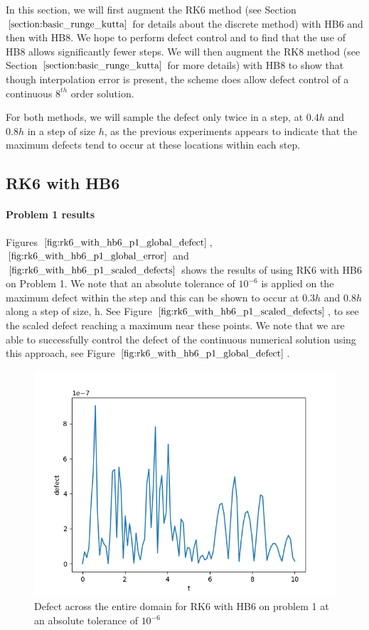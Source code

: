 In this section, we will first augment the RK6 method (see Section $\ref{section:basic_runge_kutta}$ for details about the discrete method) with HB6 and then with HB8. We hope to perform defect control and to find that the use of HB8 allows significantly fewer steps. We will then augment the RK8 method (see Section $\ref{section:basic_runge_kutta}$ for more details) with HB8 to show that though interpolation error is present, the scheme does allow defect control of a continuous $8^{th}$ order solution. 

For both methods, we will sample the defect only twice in a step, at $0.4h$ and $0.8h$ in a step of size $h$, as the previous experiments appears to indicate that the maximum defects tend to occur at these locations within each step.

\subsection{RK6 with HB6}
\paragraph{Problem 1 results}
Figures $\ref{fig:rk6_with_hb6_p1_global_defect}$, $\ref{fig:rk6_with_hb6_p1_global_error}$ and $\ref{fig:rk6_with_hb6_p1_scaled_defects}$ shows the results of using RK6 with HB6 on Problem 1. We note that an absolute tolerance of $10^{-6}$ is applied on the maximum defect within the step and this can be shown to occur at $0.3h$ and $0.8h$ along a step of size, h. See Figure $\ref{fig:rk6_with_hb6_p1_scaled_defects}$, to see the scaled defect reaching a maximum near these points. We note that we are able to successfully control the defect of the continuous numerical solution using this approach, see Figure $\ref{fig:rk6_with_hb6_p1_global_defect}$. 

\begin{figure}[H]
\centering
\includegraphics[width=0.7\linewidth]{./figures/rk6_with_hb6_p1_global_defect}
\caption{Defect across the entire domain for RK6 with HB6 on problem 1 at an absolute tolerance of $10^{-6}$}
\label{fig:rk6_with_hb6_p1_global_defect}
\end{figure}

